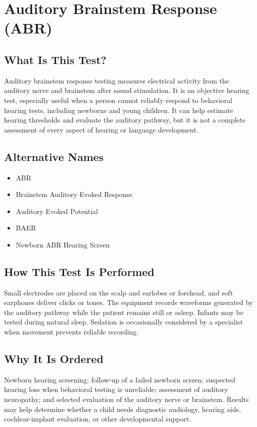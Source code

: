 \chapter{Auditory Brainstem Response (ABR)}

\section*{What Is This Test?}
Auditory brainstem response testing measures electrical activity from the auditory nerve and brainstem after sound stimulation. It is an objective hearing test, especially useful when a person cannot reliably respond to behavioral hearing tests, including newborns and young children. It can help estimate hearing thresholds and evaluate the auditory pathway, but it is not a complete assessment of every aspect of hearing or language development.

\section*{Alternative Names}
\begin{itemize}
  \item ABR
  \item Brainstem Auditory Evoked Response
  \item Auditory Evoked Potential
  \item BAER
  \item Newborn ABR Hearing Screen
\end{itemize}
\section*{How This Test Is Performed}
Small electrodes are placed on the scalp and earlobes or forehead, and soft earphones deliver clicks or tones. The equipment records waveforms generated by the auditory pathway while the patient remains still or asleep. Infants may be tested during natural sleep. Sedation is occasionally considered by a specialist when movement prevents reliable recording.

\section*{Why It Is Ordered}
Newborn hearing screening; follow-up of a failed newborn screen; suspected hearing loss when behavioral testing is unreliable; assessment of auditory neuropathy; and selected evaluation of the auditory nerve or brainstem. Results may help determine whether a child needs diagnostic audiology, hearing aids, cochlear-implant evaluation, or other developmental support.

